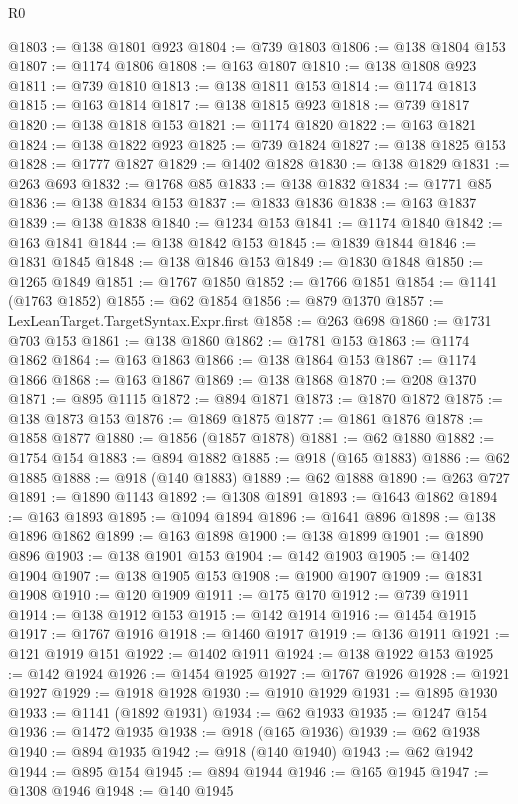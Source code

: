 \begin{lexlean}{R0}
\begin{coremodule}
@1803 := @138 @1801 @923
@1804 := @739 @1803
@1806 := @138 @1804 @153
@1807 := @1174 @1806
@1808 := @163 @1807
@1810 := @138 @1808 @923
@1811 := @739 @1810
@1813 := @138 @1811 @153
@1814 := @1174 @1813
@1815 := @163 @1814
@1817 := @138 @1815 @923
@1818 := @739 @1817
@1820 := @138 @1818 @153
@1821 := @1174 @1820
@1822 := @163 @1821
@1824 := @138 @1822 @923
@1825 := @739 @1824
@1827 := @138 @1825 @153
@1828 := @1777 @1827
@1829 := @1402 @1828
@1830 := @138 @1829
@1831 := @263 @693
@1832 := @1768 @85
@1833 := @138 @1832
@1834 := @1771 @85
@1836 := @138 @1834 @153
@1837 := @1833 @1836
@1838 := @163 @1837
@1839 := @138 @1838
@1840 := @1234 @153
@1841 := @1174 @1840
@1842 := @163 @1841
@1844 := @138 @1842 @153
@1845 := @1839 @1844
@1846 := @1831 @1845
@1848 := @138 @1846 @153
@1849 := @1830 @1848
@1850 := @1265 @1849
@1851 := @1767 @1850
@1852 := @1766 @1851
@1854 := @1141 (@1763 @1852)
@1855 := @62 @1854
@1856 := @879 @1370
@1857 := LexLeanTarget.TargetSyntax.Expr.first
@1858 := @263 @698
@1860 := @1731 @703 @153
@1861 := @138 @1860
@1862 := @1781 @153
@1863 := @1174 @1862
@1864 := @163 @1863
@1866 := @138 @1864 @153
@1867 := @1174 @1866
@1868 := @163 @1867
@1869 := @138 @1868
@1870 := @208 @1370
@1871 := @895 @1115
@1872 := @894 @1871
@1873 := @1870 @1872
@1875 := @138 @1873 @153
@1876 := @1869 @1875
@1877 := @1861 @1876
@1878 := @1858 @1877
@1880 := @1856 (@1857 @1878)
@1881 := @62 @1880
@1882 := @1754 @154
@1883 := @894 @1882
@1885 := @918 (@165 @1883)
@1886 := @62 @1885
@1888 := @918 (@140 @1883)
@1889 := @62 @1888
@1890 := @263 @727
@1891 := @1890 @1143
@1892 := @1308 @1891
@1893 := @1643 @1862
@1894 := @163 @1893
@1895 := @1094 @1894
@1896 := @1641 @896
@1898 := @138 @1896 @1862
@1899 := @163 @1898
@1900 := @138 @1899
@1901 := @1890 @896
@1903 := @138 @1901 @153
@1904 := @142 @1903
@1905 := @1402 @1904
@1907 := @138 @1905 @153
@1908 := @1900 @1907
@1909 := @1831 @1908
@1910 := @120 @1909
@1911 := @175 @170
@1912 := @739 @1911
@1914 := @138 @1912 @153
@1915 := @142 @1914
@1916 := @1454 @1915
@1917 := @1767 @1916
@1918 := @1460 @1917
@1919 := @136 @1911
@1921 := @121 @1919 @151
@1922 := @1402 @1911
@1924 := @138 @1922 @153
@1925 := @142 @1924
@1926 := @1454 @1925
@1927 := @1767 @1926
@1928 := @1921 @1927
@1929 := @1918 @1928
@1930 := @1910 @1929
@1931 := @1895 @1930
@1933 := @1141 (@1892 @1931)
@1934 := @62 @1933
@1935 := @1247 @154
@1936 := @1472 @1935
@1938 := @918 (@165 @1936)
@1939 := @62 @1938
@1940 := @894 @1935
@1942 := @918 (@140 @1940)
@1943 := @62 @1942
@1944 := @895 @154
@1945 := @894 @1944
@1946 := @165 @1945
@1947 := @1308 @1946
@1948 := @140 @1945

\end{coremodule}
\end{lexlean}
